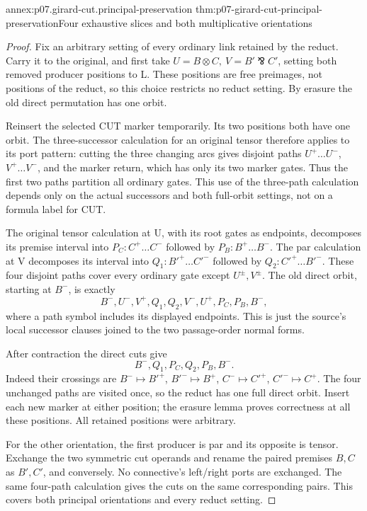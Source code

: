 \begin{annexitem}{annex:p07.girard-cut.principal-preservation}
 {thm:p07-girard-cut-principal-preservation}{Four exhaustive slices and both multiplicative orientations}
\begin{proof}
Fix an arbitrary setting of every ordinary link retained by the reduct.
Carry it to the original, and first take
\(U=B\otimes C,\ V=B'\bindnasrepma C'\), setting both removed
producer positions to L. These positions are free preimages, not
positions of the reduct, so this choice restricts no reduct setting.
By erasure the old direct permutation has one orbit.

Reinsert the selected CUT marker temporarily. Its two positions both
have one orbit. The three-successor calculation for an original tensor
therefore applies to its port pattern: cutting the three changing arcs
gives disjoint paths \(U^+\ldots U^-\), \(V^+\ldots V^-\),
and the marker return, which has only its two marker gates.
Thus the first two paths partition all ordinary gates.
This use of the three-path calculation depends only on the actual
successors and both full-orbit settings, not on a formula label for CUT.

The original tensor calculation at U, with its root gates as endpoints,
decomposes its premise interval into
\(P_C:C^+\ldots C^-\) followed by \(P_B:B^+\ldots B^-\).
The par calculation at V decomposes its interval into
\(Q_1:B'^+\ldots C'^-\) followed by \(Q_2:C'^+\ldots B'^-\).
These four disjoint paths cover every ordinary gate except \(U^\pm,V^\pm\).
The old direct orbit, starting at \(B^-\), is exactly
\[
 B^-,U^-,V^+,Q_1,Q_2,V^-,U^+,P_C,P_B,B^-,
\]
where a path symbol includes its displayed endpoints.
This is just the source's local successor clauses joined to the
two passage-order normal forms.

After contraction the direct cuts give
\[
 B^-,Q_1,P_C,Q_2,P_B,B^-.
\]
Indeed their crossings are \(B^-\mapsto B'^+\),
\(B'^-\mapsto B^+\), \(C^-\mapsto C'^+\),
\(C'^-\mapsto C^+\). The four unchanged paths are visited once,
so the reduct has one full direct orbit.
Insert each new marker at either position; the erasure lemma proves
correctness at all these positions. All retained positions were arbitrary.

For the other orientation, the first producer is par and its opposite
is tensor. Exchange the two symmetric cut operands and rename the
paired premises \(B,C\) as \(B',C'\), and conversely.
No connective's left/right ports are exchanged. The same four-path
calculation gives the cuts on the same corresponding pairs.
This covers both principal orientations and every reduct setting.
\end{proof}
\end{annexitem}

